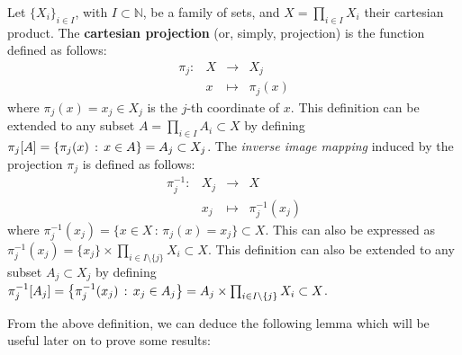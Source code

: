 \begin{definition}
	\label{def:projection}
	Let $\{X_i\}_{i\in I}$, with $I\subset\mathbb{N}$, be a family of sets, and
	$X=\prod_{i\in I} X_i$ their cartesian product.
	The \textbf{cartesian projection} (or, simply, projection) is the function defined as follows:
	$$
  	\begin{array}{rrcl}
		\pi_j : & X &\longrightarrow & X_j\\
		 & x &\longmapsto     & \pi_j(x)
  	\end{array}
	$$
	where $\pi_j(x)=x_j \in X_j$ is the $j$-th coordinate of $x$.
	This definition can be extended to any subset $A=\prod_{i\in I}A_i\subset X$
	by defining $\pi_j[A] = \setdef{\pi_j(x)}{x\in A}\linebreak = A_j\subset X_j$.
	The \emph{inverse image mapping} induced by the projection $\pi_j$ is defined as follows:
	$$
		\begin{array}{rrcl}
			\pi^{-1}_j : & X_j &\longrightarrow & X\\
			 & x_j &\longmapsto     & \pi^{-1}_j(x_j)
		\end{array}
	$$
	where $\pi^{-1}_j(x_j)=\{x\in X\,:\,\pi_j(x)=x_j\} \subset X$.
	This can also be expressed as $\pi^{-1}_j(x_j) = \{x_j\} \times \prod_{i\in I\setminus\{j\}}X_i \subset X$.
	This definition can also be extended to any subset $A_j\subset X_j$ by defining
	$\pi^{-1}_j[A_j]=\left\{\pi^{-1}_j(x_j)\,:\,x_j\in A_j\right\}=A_j\times\prod_{i\in I\setminus\{j\}}X_i\subset X$.
\end{definition}

From the above definition, we can deduce the following lemma which will be useful later on to prove some results:

